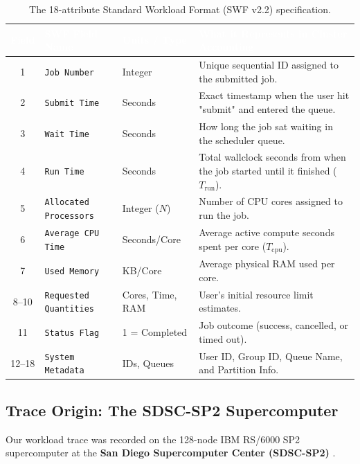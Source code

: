 \documentclass[11pt,a4paper]{article}
\begin{document}
\begin{table}[tbp]
\centering
\footnotesize
\renewcommand{\arraystretch}{1.25}
\begin{tabularx}{\textwidth}{c l l X}
\toprule
\rowcolor{tableheader}
\textcolor{white}{\textbf{Field}} & \textcolor{white}{\textbf{SWF Field Name}} & \textcolor{white}{\textbf{Units / Type}} & \textcolor{white}{\textbf{What it Represents in Cluster Accounting}} \\
\midrule
1 & \texttt{Job Number} & Integer & Unique sequential ID assigned to the submitted job. \\
\rowcolor{altrow}
2 & \texttt{Submit Time} & Seconds & Exact timestamp when the user hit "submit" and entered the queue. \\
3 & \texttt{Wait Time} & Seconds & How long the job sat waiting in the scheduler queue. \\
\rowcolor{altrow}
4 & \texttt{Run Time} & Seconds & Total wallclock seconds from when the job started until it finished ($T_{\text{run}}$). \\
5 & \texttt{Allocated Processors} & Integer ($N$) & Number of CPU cores assigned to run the job. \\
\rowcolor{altrow}
6 & \texttt{Average CPU Time} & Seconds/Core & Average active compute seconds spent per core ($T_{\text{cpu}}$). \\
7 & \texttt{Used Memory} & KB/Core & Average physical RAM used per core. \\
\rowcolor{altrow}
8--10 & \texttt{Requested Quantities} & Cores, Time, RAM & User's initial resource limit estimates. \\
11 & \texttt{Status Flag} & 1 = Completed & Job outcome (success, cancelled, or timed out). \\
\rowcolor{altrow}
12--18 & \texttt{System Metadata} & IDs, Queues & User ID, Group ID, Queue Name, and Partition Info. \\
\bottomrule
\end{tabularx}
\caption{The 18-attribute Standard Workload Format (SWF v2.2) specification.}
\label{tab:swf_format}
\end{table}

\subsection{Trace Origin: The SDSC-SP2 Supercomputer}
Our workload trace was recorded on the 128-node IBM RS/6000 SP2 supercomputer at the \textbf{San Diego Supercomputer Center (SDSC-SP2)} \cite{downey2000sdsc}. 
\end{document}
